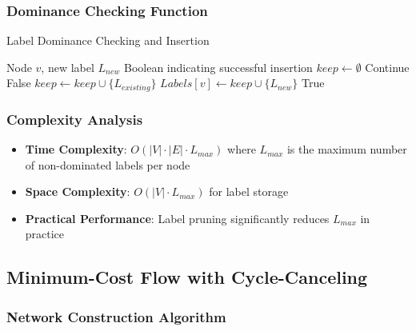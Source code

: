 \documentclass[12pt,a4paper]{article}
\begin{document}
\subsubsection{Dominance Checking Function}

\begin{algorithm}
\caption{Label Dominance Checking and Insertion}
\begin{algorithmic}[1]
\REQUIRE Node $v$, new label $L_{new}$
\ENSURE Boolean indicating successful insertion
\STATE $keep \leftarrow \emptyset$
        \STATE Continue 
        \RETURN False 
    \ELSE
        \STATE $keep \leftarrow keep \cup \{L_{existing}\}$
    \ENDIF
\ENDFOR
\STATE $Labels[v] \leftarrow keep \cup \{L_{new}\}$
\RETURN True
\end{algorithmic}
\end{algorithm}

\subsubsection{Complexity Analysis}
\begin{itemize}
    \item \textbf{Time Complexity}: $O(|V| \cdot |E| \cdot L_{max})$ where $L_{max}$ is the maximum number of non-dominated labels per node
    \item \textbf{Space Complexity}: $O(|V| \cdot L_{max})$ for label storage
    \item \textbf{Practical Performance}: Label pruning significantly reduces $L_{max}$ in practice
\end{itemize}

\subsection{Minimum-Cost Flow with Cycle-Canceling}

\subsubsection{Network Construction Algorithm}
\end{document}
